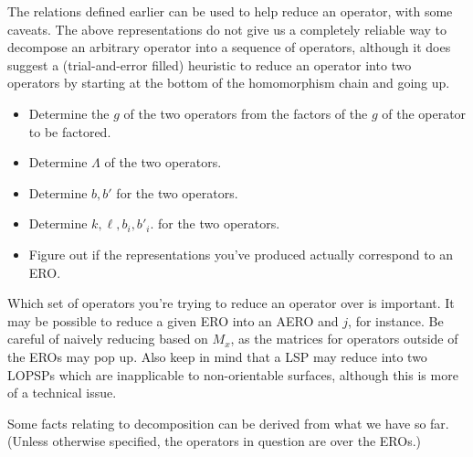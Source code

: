 \documentclass[12pt]{amsart}%
\begin{document}
The relations defined earlier can be used to help reduce an operator,
with some caveats. The above representations do not give us a completely
reliable way to decompose an arbitrary operator into a sequence of operators,
although it does suggest a (trial-and-error filled) heuristic to reduce an
operator into two operators by starting at the bottom of the homomorphism chain
and going up.

\begin{itemize}
  \item Determine the $g$ of the two operators from the factors of the
    $g$ of the operator to be factored.
  \item Determine $\Lambda$ of the two operators.
  \item Determine $b, b'$ for the two operators.
  \item Determine $k, \ell, b_i, b'_i$. for the two operators.
  \item Figure out if the representations you've produced
    actually correspond to an ERO.
\end{itemize}

Which set of operators you're trying to reduce an operator over is important.
It may be possible to reduce a given ERO into an AERO and $j$, for instance.
Be careful of naively reducing based on $M_x$, as the matrices for operators
outside of the EROs may pop up. Also keep in mind that a LSP may reduce into
two LOPSPs which are inapplicable to non-orientable surfaces, although this is
more of a technical issue.

Some facts relating to decomposition can be derived from what we have
so far.
(Unless otherwise specified, the operators in question are over the EROs.)
\end{document}
